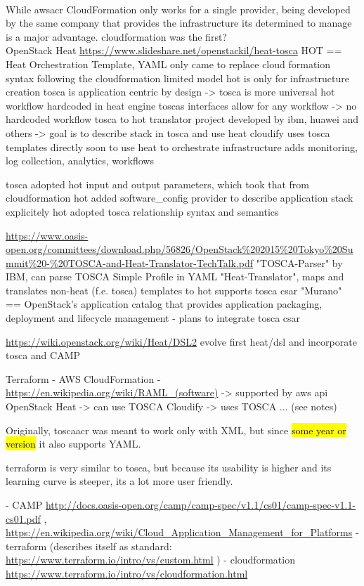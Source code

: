 \\
While \gls{awsacr} CloudFormation only works for a single provider, being developed by the same company that provides the infrastructure its determined to manage is a major advantage.
cloudformation was the first?
\\
OpenStack Heat 
\url{https://www.slideshare.net/openstackil/heat-tosca}
HOT == Heat Orchestration Template, YAML only
came to replace cloud formation syntax
following the cloudformation limited model
hot is only for infrastructure creation
tosca is application centric by design
-> tosca is more universal
hot workflow hardcoded in heat engine
toscas interfaces allow for any workflow -> no hardcoded workflow
tosca to hot translator project developed by ibm, huawei and others -> goal is to describe stack in tosca and use heat
cloudify uses tosca templates directly
  soon to use heat to orchestrate infrastructure
  adds monitoring, log collection, analytics, workflows

tosca adopted hot input and output parameters, which took that from cloudformation
hot added software\_config provider to describe application stack explicitely
hot adopted tosca relationship syntax and semantics

\url{https://www.oasis-open.org/committees/download.php/56826/OpenStack%202015%20Tokyo%20Summit%20-%20TOSCA-and-Heat-Translator-TechTalk.pdf}
"TOSCA-Parser" by IBM, can parse TOSCA Simple Profile in YAML
"Heat-Translator", maps and translates non-heat (f.e. tosca) templates to hot
  supports tosca csar
"Murano" == OpenStack's application catalog that provides application packaging, deployment and lifecycle management - plans to integrate tosca csar

\url{https://wiki.openstack.org/wiki/Heat/DSL2}
evolve first heat/dsl and incorporate tosca and CAMP

Terraform
- AWS CloudFormation
  - \url{https://en.wikipedia.org/wiki/RAML\_(software)} -> supported by aws api
OpenStack Heat -> can use TOSCA
Cloudify -> uses TOSCA
... (see notes)

Originally, \gls{toscaacr} was meant to work only with XML, but since \hl{some year or version} it also supports YAML.

terraform is very similar to tosca, but because its usability is higher and its learning curve is steeper, its a lot more user friendly.

- CAMP \url{http://docs.oasis-open.org/camp/camp-spec/v1.1/cs01/camp-spec-v1.1-cs01.pdf} , \url{https://en.wikipedia.org/wiki/Cloud\_Application\_Management\_for\_Platforms}
- terraform (describes itself as standard: \url{https://www.terraform.io/intro/vs/custom.html} )
- cloudformation \url{https://www.terraform.io/intro/vs/cloudformation.html}

